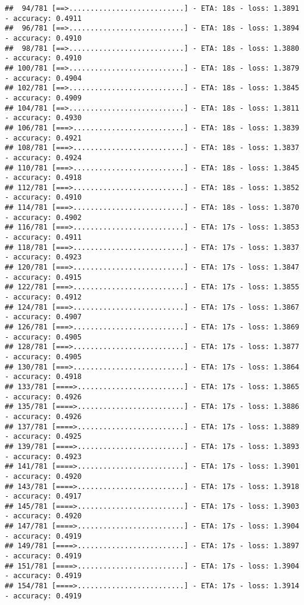 \documentclass[
]{article}
\begin{document}
\begin{verbatim}
##  94/781 [==>...........................] - ETA: 18s - loss: 1.3891 - accuracy: 0.4911
##  96/781 [==>...........................] - ETA: 18s - loss: 1.3894 - accuracy: 0.4910
##  98/781 [==>...........................] - ETA: 18s - loss: 1.3880 - accuracy: 0.4910
## 100/781 [==>...........................] - ETA: 18s - loss: 1.3879 - accuracy: 0.4904
## 102/781 [==>...........................] - ETA: 18s - loss: 1.3845 - accuracy: 0.4909
## 104/781 [==>...........................] - ETA: 18s - loss: 1.3811 - accuracy: 0.4930
## 106/781 [===>..........................] - ETA: 18s - loss: 1.3839 - accuracy: 0.4921
## 108/781 [===>..........................] - ETA: 18s - loss: 1.3837 - accuracy: 0.4924
## 110/781 [===>..........................] - ETA: 18s - loss: 1.3845 - accuracy: 0.4918
## 112/781 [===>..........................] - ETA: 18s - loss: 1.3852 - accuracy: 0.4910
## 114/781 [===>..........................] - ETA: 18s - loss: 1.3870 - accuracy: 0.4902
## 116/781 [===>..........................] - ETA: 17s - loss: 1.3853 - accuracy: 0.4911
## 118/781 [===>..........................] - ETA: 17s - loss: 1.3837 - accuracy: 0.4923
## 120/781 [===>..........................] - ETA: 17s - loss: 1.3847 - accuracy: 0.4915
## 122/781 [===>..........................] - ETA: 17s - loss: 1.3855 - accuracy: 0.4912
## 124/781 [===>..........................] - ETA: 17s - loss: 1.3867 - accuracy: 0.4907
## 126/781 [===>..........................] - ETA: 17s - loss: 1.3869 - accuracy: 0.4905
## 128/781 [===>..........................] - ETA: 17s - loss: 1.3877 - accuracy: 0.4905
## 130/781 [===>..........................] - ETA: 17s - loss: 1.3864 - accuracy: 0.4918
## 133/781 [====>.........................] - ETA: 17s - loss: 1.3865 - accuracy: 0.4926
## 135/781 [====>.........................] - ETA: 17s - loss: 1.3886 - accuracy: 0.4926
## 137/781 [====>.........................] - ETA: 17s - loss: 1.3889 - accuracy: 0.4925
## 139/781 [====>.........................] - ETA: 17s - loss: 1.3893 - accuracy: 0.4923
## 141/781 [====>.........................] - ETA: 17s - loss: 1.3901 - accuracy: 0.4920
## 143/781 [====>.........................] - ETA: 17s - loss: 1.3918 - accuracy: 0.4917
## 145/781 [====>.........................] - ETA: 17s - loss: 1.3903 - accuracy: 0.4920
## 147/781 [====>.........................] - ETA: 17s - loss: 1.3904 - accuracy: 0.4919
## 149/781 [====>.........................] - ETA: 17s - loss: 1.3897 - accuracy: 0.4919
## 151/781 [====>.........................] - ETA: 17s - loss: 1.3904 - accuracy: 0.4919
## 154/781 [====>.........................] - ETA: 17s - loss: 1.3914 - accuracy: 0.4919

\end{verbatim}
\end{document}
